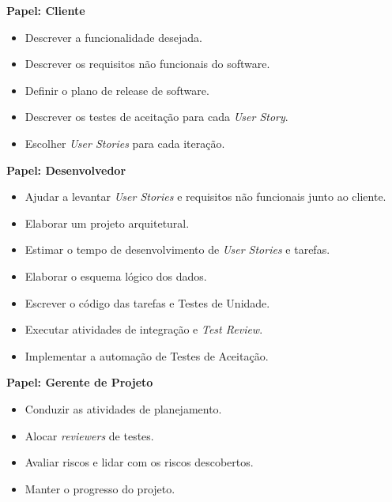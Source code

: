 \textbf{Papel: Cliente}
\begin{itemize}
 \item Descrever a funcionalidade desejada.
 \item Descrever os requisitos não funcionais do software.
 \item Definir o plano de release de software.
 \item Descrever os testes de aceitação para cada \textit{User Story}.
 \item Escolher \textit{User Stories} para cada iteração.
\end{itemize}

\textbf{Papel: Desenvolvedor}
\begin{itemize}
 \item Ajudar a levantar \textit{User Stories} e requisitos não funcionais junto ao cliente.
 \item Elaborar um projeto arquitetural.
 \item Estimar o tempo de desenvolvimento de \textit{User Stories} e tarefas.
 \item Elaborar o esquema lógico dos dados.
 \item Escrever o código das tarefas e Testes de Unidade.
 \item Executar atividades de integração e \textit{Test Review}.
 \item Implementar a automação de Testes de Aceitação.
\end{itemize}

\textbf{Papel: Gerente de Projeto}
\begin{itemize}
 \item Conduzir as atividades de planejamento.
 \item Alocar \textit{reviewers} de testes.
 \item Avaliar riscos e lidar com os riscos descobertos.
 \item Manter o progresso do projeto.
\end{itemize}


